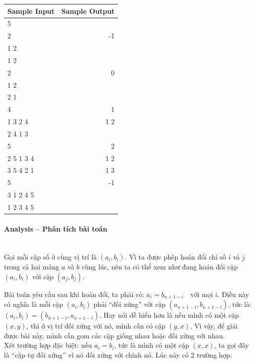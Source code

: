 \documentclass{article}
\begin{document}
\begin{table}[h]
    \centering
    \begin{tabular}{|l|r|}
        \hline
        \rowcolor{gray!30}
        \textbf{Sample Input} & \textbf{Sample Output} \\
        \hline
        5 & \\
        2 & -1 \\
        1 2 & \\
        1 2 & \\
        2 & 0 \\
        1 2 & \\
        2 1 & \\
        4 & 1 \\
        1 3 2 4 & 1 2 \\
        2 4 1 3 & \\
        5 & 2 \\
        2 5 1 3 4 & 1 2 \\
        3 5 4 2 1 & 1 3 \\
        5 & -1 \\
        3 1 2 4 5 & \\
        1 2 3 4 5 & \\
        \hline
    \end{tabular}
\end{table}

\paragraph{Analysis -- Phân tích bài toán} \mbox{} \\

Gọi mỗi cặp số ở cùng vị trí là $(a_i, b_i)$. Vì ta được phép hoán đổi chỉ số $i$ và $j$ trong cả hai mảng $a$ và $b$ cùng lúc, nên ta có thể xem như đang hoán đổi cặp $(a_i, b_i)$ với cặp $(a_j, b_j)$.

Bài toán yêu cầu sau khi hoán đổi, ta phải có: $a_i = b_{n+1-i} \quad \text{với mọi } i.$
Điều này có nghĩa là mỗi cặp $(a_i, b_i)$ phải ``đối xứng'' với cặp $(a_{n+1-i}, b_{n+1-i})$, tức là: $(a_i, b_i) = (b_{n+1-i}, a_{n+1-i}).$
Hay nói dễ hiểu hơn là nếu mình có một cặp $(x, y)$, thì ở vị trí đối xứng với nó, mình cần có cặp $(y, x)$. Vì vậy, để giải được bài này, mình cần gom các cặp giống nhau hoặc đối xứng với nhau.\\

Xét trường hợp đặc biệt: nếu $a_i = b_i$, tức là mình có một cặp $(x, x)$, ta gọi đây là ``cặp tự đối xứng'' vì nó đối xứng với chính nó. Lúc này có 2 trường hợp:
\end{document}
